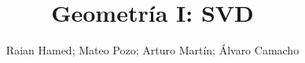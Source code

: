 
\title{Geometría I: SVD}
\author{Raian Hamed; Mateo Pozo; Arturo Martín; Álvaro
Camacho}


\maketitle
\tableofcontents










